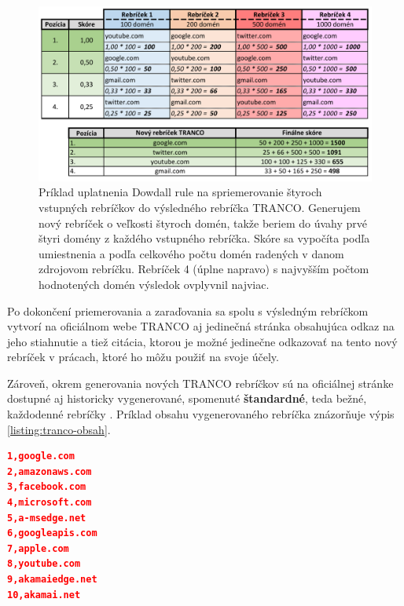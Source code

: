 \begin{figure}[htb]
\begin{center}
 \includegraphics[scale=0.84]{obrazky-figures/dowdall_rule_size_fit_cropped.pdf}
 \caption{\centering Príklad uplatnenia Dowdall rule na spriemerovanie štyroch vstupných rebríčkov do výsledného rebríčka TRANCO. Generujem nový rebríček o veľkosti štyroch domén, takže beriem do úvahy prvé štyri domény z každého vstupného rebríčka. Skóre sa vypočíta podľa umiestnenia a podľa celkového počtu domén radených v danom zdrojovom rebríčku. Rebríček 4 (úplne napravo) s najvyšším počtom hodnotených domén výsledok ovplyvnil najviac.}
 \label{img:dowdall-rule}
\end{center}
\end{figure}



Po dokončení priemerovania a zaraďovania sa spolu s výsledným rebríčkom vytvorí na oficiálnom webe TRANCO aj jedinečná stránka obsahujúca odkaz na jeho stiahnutie a tiež citácia, 
ktorou je možné jedinečne odkazovať na tento nový rebríček v prácach, ktoré ho môžu použiť na svoje účely.

Zároveň, okrem generovania nových TRANCO rebríčkov sú na oficiálnej stránke dostupné aj historicky vygenerované, spomenuté \textbf{štandardné}, teda bežné, každodenné rebríčky \cite{tranco-homepage}.
Príklad obsahu vygenerovaného rebríčka znázorňuje výpis \ref{listing:tranco-obsah}.



\pagebreak

\begin{center}
\centering
\begin{lstlisting}[caption={\centering Ukážka vygenerovaného denného rebríčku z 12. januára 2024, orezaného na prvých 10 domén. Rebríček je možné stiahnuť vo formáte \code{zip} archívu, ktorý obsahuje práve jeden súbor nazvaný \textbf{top-1m.csv}. Obsahom je na každom riadku pozícia domény a jej čiarkou oddelené meno.},
label=listing:tranco-obsah, 
language=json, 
frame=lb,
xleftmargin=.3875\textwidth, 
xrightmargin=.3875\textwidth]
1,google.com
2,amazonaws.com
3,facebook.com
4,microsoft.com
5,a-msedge.net
6,googleapis.com
7,apple.com
8,youtube.com
9,akamaiedge.net
10,akamai.net

\end{lstlisting}
\end{center}




